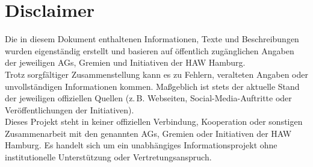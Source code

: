 \documentclass[12pt, a4paper]{article}
\begin{document}
\bigskip
\hawrule

\section*{Disclaimer}

Die in diesem Dokument enthaltenen Informationen, Texte und Beschreibungen wurden eigenständig erstellt und basieren auf öffentlich zugänglichen Angaben der jeweiligen AGs, Gremien und Initiativen der HAW Hamburg.
\\
Trotz sorgfältiger Zusammenstellung kann es zu Fehlern, veralteten Angaben oder unvollständigen Informationen kommen. Maßgeblich ist stets der aktuelle Stand der jeweiligen offiziellen Quellen (z.\,B. Webseiten, Social-Media-Auftritte oder Veröffentlichungen der Initiativen).
\\
Dieses Projekt steht in keiner offiziellen Verbindung, Kooperation oder sonstigen Zusammenarbeit mit den genannten AGs, Gremien oder Initiativen der HAW Hamburg. Es handelt sich um ein unabhängiges Informationsprojekt ohne institutionelle Unterstützung oder Vertretungsanspruch.


\bigskip
\hawrule

\newpage
\thispagestyle{fancy}
{\hypersetup{linkcolor=hawblue}
\tableofcontents}
\newpage










\end{document}
